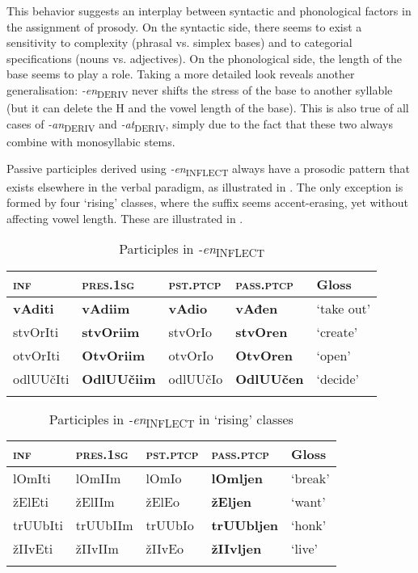 \documentclass[output=paper]{langsci/langscibook}
\begin{document}
This behavior suggests an interplay between syntactic and phonological factors in the assignment of prosody. On the syntactic side, there seems to exist a sensitivity to complexity (phrasal vs. simplex bases) and to categorial specifications (nouns vs. adjectives). On the phonological side, the length of the base seems to play a role. Taking a more detailed look reveals another generalisation: \textit{{-en}}\textsubscript{DERIV} never shifts the stress of the base to another syllable (but it can delete the H and the vowel length of the base). This is also true of all cases of \textit{-an}\textsubscript{DERIV} and
\textit{-at}\textsubscript{DERIV}, simply due to the fact that these two always combine with monosyllabic stems.

Passive participles derived using \textit{{-en}}\textsubscript{INFLECT} always have a prosodic pattern that exists elsewhere in the verbal paradigm, as illustrated in . The only exception is formed by four `rising' classes, where the suffix seems accent-erasing, yet without affecting vowel length. These are illustrated in .

\begin{table}
\caption{Participles in \textit{-en}\textsubscript{INFLECT}}
\label{tab10}
 \begin{tabular}{ l l l l l}
\lsptoprule  
\textsc{inf}&\textsc{pres.1sg}&\textsc{pst.ptcp}&\textsc{pass.ptcp}& Gloss
\\ 
\midrule
\textbf{vAditi} & \textbf{vAdiim} & \textbf{vAdio} & \textbf{vAđen} & `take out' \\
stvOrIti & \textbf{stvOriim} & stvOrIo & \textbf{stvOren} & `create' \\
otvOrIti & \textbf{OtvOriim} & otvOrIo & \textbf{OtvOren} & `open' \\
odlUUčIti & \textbf{OdlUUčiim} & odlUUčIo & \textbf{OdlUUčen} & `decide'
\\
\lspbottomrule
 \end{tabular}
\end{table}


\begin{table}
\caption{Participles in \textit{-en}\textsubscript{INFLECT} in `rising' classes}
\label{tab11}
 \begin{tabular}{ l l l l l}
\lsptoprule  
\textsc{inf}&\textsc{pres.1sg}&\textsc{pst.ptcp}&\textsc{pass.ptcp}& Gloss
\\ 
\midrule
lOmIti & lOmIIm & lOmIo & \textbf{lOmljen} & `break' \\
žElEti & žElIIm & žElEo & \textbf{žEljen} & `want'\\
trUUbIti & trUUbIIm & trUUbIo & \textbf{trUUbljen} & `honk'  \\
žIIvEti & žIIvIIm & žIIvEo & \textbf{žIIvljen} & `live' 
\\
\lspbottomrule
 \end{tabular}
\end{table}
\end{document}
